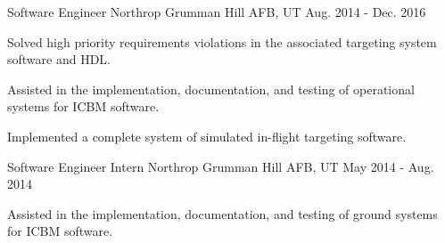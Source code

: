 \begin{cventries}
\cventry
{Software Engineer} %
{Northrop Grumman} %
{Hill AFB, UT} %
{Aug. 2014 - Dec. 2016} %
{ %
\begin{cvitems}
\item \small Solved high priority requirements violations in the associated targeting system software and HDL.
\item \small Assisted in the implementation, documentation, and testing of operational systems for ICBM software.
\item \small Implemented a complete system of simulated in-flight targeting software.
\end{cvitems}
}



\cventry
{Software Engineer Intern} %
{Northrop Grumman} %
{Hill AFB, UT} %
{May 2014 - Aug. 2014} %
{ %
\begin{cvitems}
\item \small Assisted in the implementation, documentation, and testing of ground systems for ICBM software.
\end{cvitems}
}

\end{cventries}